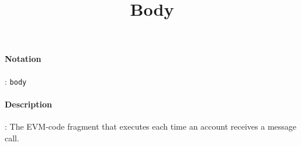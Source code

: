 \documentclass[10pt,a4paper,oneside]{scrartcl}
\author{}
\title{Body}
\date{}
\begin{document}
\maketitle
\paragraph{Notation}: \texttt{body}
\paragraph{Description}: The EVM-code fragment that executes each time an account receives a message call. 
\end{document}
